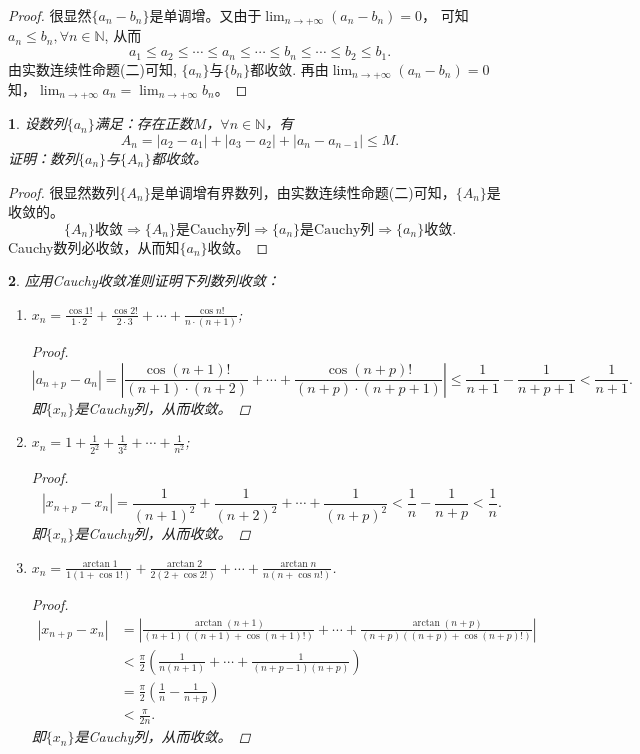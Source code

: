\documentclass[utf8]{book}
\newtheorem{example}{}[section]             %
\begin{document}
\begin{proof}
很显然$\{a_n-b_n\}$是单调增。又由于$\displaystyle \lim_{n\to +\infty}(a_n-b_n)=0$， 可知 $a_n \leq b_n,\forall n\in\mathbb{N}$, 从而
$$a_1 \leq a_2 \leq\cdots\leq a_n \leq \cdots \leq b_n \leq \cdots \leq b_2\leq b_1.$$
由实数连续性命题(二)可知, $\{a_n\}$与$\{b_n\}$都收敛. 再由$\displaystyle \lim_{n\to +\infty}(a_n-b_n)=0$知，$\displaystyle \lim_{n\to +\infty}a_n=\displaystyle \lim_{n\to +\infty}b_n$。
\end{proof}
\begin{example}
设数列$\{a_n\}$满足：存在正数$M$，$\forall n\in\mathbb{N}$，有$$A_n = \left|a_2-a_1 \right| +\left|a_3-a_2 \right| + \left|a_n-a_{n-1} \right| \leq M.$$
证明：数列$\{a_n\}$与$\{A_n\}$都收敛。
\end{example}
\begin{proof}
很显然数列$\{A_n\}$是单调增有界数列，由实数连续性命题(二)可知，$\{A_n\}$是收敛的。
$$\{A_n\}\text{收敛}\Rightarrow \{A_n\}\text{是Cauchy列}\Rightarrow \{a_n\}\text{是Cauchy列} \Rightarrow \{a_n\}\text{收敛}.$$
Cauchy数列必收敛，从而知$\{a_n\}$收敛。
\end{proof}
\begin{example}
应用Cauchy收敛准则证明下列数列收敛：
\renewcommand\labelenumi{\normalfont(\theenumi)}
\begin{enumerate}
\item $\displaystyle x_n=\frac{\cos{1!}}{1\cdot 2}+\frac{\cos{2!}}{2\cdot 3}+\cdots+\frac{\cos{n!}}{n\cdot (n+1)}$;
\begin{proof}
$$\left|a_{n+p} - a_{n}\right| = \left|\frac{\cos{(n+1)!}}{(n+1)\cdot (n+2)}+\cdots+\frac{\cos{(n+p)!}}{(n+p)\cdot (n+p+1)}\right|\leq 
\frac{1}{n+1} - \frac{1}{n+p+1} < \frac{1}{n+1}.$$
即$\{x_n\}$是Cauchy列，从而收敛。
\end{proof}
\item $\displaystyle x_n=1+\frac{1}{2^2}+\frac{1}{3^2}+\cdots+\frac{1}{n^2}$;
\begin{proof}
$$\left|x_{n+p}-x_n\right| = \frac{1}{(n+1)^2}+\frac{1}{(n+2)^2}+\cdots+\frac{1}{(n+p)^2}<\frac{1}{n}-\frac{1}{n+p}<
\frac{1}{n}.$$
即$\{x_n\}$是Cauchy列，从而收敛。
\end{proof}
\item $\displaystyle x_n = \frac{\arctan{1}}{1(1+\cos{1!})}+\frac{\arctan{2}}{2(2+\cos{2!})}+\cdots+\frac{\arctan{n}}{n(n+\cos{n!})}$.
\begin{proof}
\begin{equation*}
\begin{split}
\left|x_{n+p}-x_{n}\right| &= \left|\frac{\arctan{(n+1)}}{(n+1)((n+1)+\cos{(n+1)!})}+\cdots+\frac{\arctan{(n+p)}}{(n+p)((n+p)+\cos{(n+p)!})}\right| \\
&<\frac{\pi}{2}\left(\frac{1}{n(n+1)}+\cdots+\frac{1}{(n+p-1)(n+p)}\right)\\
&=\frac{\pi}{2}\left(\frac{1}{n}-\frac{1}{n+p}\right)\\
&<\frac{\pi}{2n}.
\end{split}
\end{equation*}
即$\{x_n\}$是Cauchy列，从而收敛。
\end{proof}
\end{enumerate}
\end{example}
\end{document}
